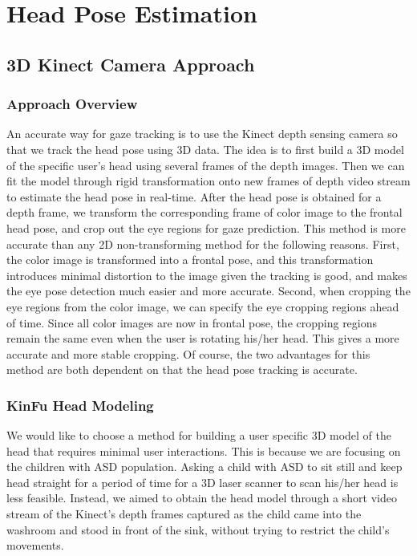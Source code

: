 \documentclass{ut-thesis}
\begin{document}
\section{Head Pose Estimation}

%

\subsection{3D Kinect Camera Approach}

\subsubsection{Approach Overview}
\label{sec:approachOverview}
An accurate way for gaze tracking is to use the Kinect depth sensing camera so that we track the head pose using 3D data.  The idea is to first build a 3D model of the specific user's head using several frames of the depth images.  Then we can fit the model through rigid transformation onto new frames of depth video stream to estimate the head pose in real-time.  After the head pose is obtained for a depth frame, we transform the corresponding frame of color image to the frontal head pose, and crop out the eye regions for gaze prediction.  This method is more accurate than any 2D non-transforming method for the following reasons.  First, the color image is transformed into a frontal pose, and this transformation introduces minimal distortion to the image given the tracking is good, and makes the eye pose detection much easier and more accurate.  Second, when cropping the eye regions from the color image, we can specify the eye cropping regions ahead of time.  Since all color images are now in frontal pose, the cropping regions remain the same even when the user is rotating his/her head.  This gives a more accurate and more stable cropping.  Of course, the two advantages for this method are both dependent on that the head pose tracking is accurate.

\subsubsection{KinFu Head Modeling}
We would like to choose a method for building a user specific 3D model of the head that requires minimal user interactions.  This is because we are focusing on the children with ASD population.  Asking a child with ASD to sit still and keep head straight for a period of time for a 3D laser scanner to scan his/her head is less feasible.  Instead, we aimed to obtain the head model through a short video stream of the Kinect's depth frames captured as the child came into the washroom and stood in front of the sink, without trying to restrict the child's movements.
\end{document}
